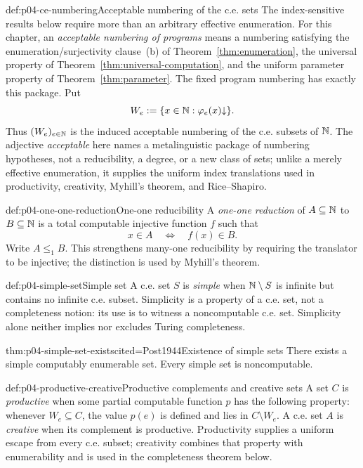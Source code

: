 \begin{hbconvention}{def:p04-ce-numbering}{Acceptable numbering of the c.e. sets}
The index-sensitive results below require more than an arbitrary effective
enumeration.  For this chapter, an \emph{acceptable numbering of programs}
means a numbering satisfying the enumeration/surjectivity clause~(b) of
Theorem~\ref{thm:enumeration}, the universal property of
Theorem~\ref{thm:universal-computation}, and the uniform parameter
property of Theorem~\ref{thm:parameter}.  The fixed program numbering has
exactly this package.  Put
\[
 W_e\mathrel{:=}\{x\in\mathbb{N}:\varphi_e(x)\mathord\downarrow\}.
\]
Thus \((W_e)_{e\in\mathbb{N}}\) is the induced acceptable numbering of the c.e.
subsets of \(\mathbb{N}\).  The adjective \emph{acceptable} here names a
metalinguistic package of numbering hypotheses, not a reducibility, a degree,
or a new class of sets; unlike a merely effective enumeration, it supplies
the uniform index translations used in productivity, creativity, Myhill's
theorem, and Rice--Shapiro.
\end{hbconvention}

\begin{hbdefinition}{def:p04-one-one-reduction}{One-one reducibility}
A \emph{one-one reduction} of \(A\subseteq\mathbb{N}\) to \(B\subseteq\mathbb{N}\) is a
total computable injective function \(f\) such that
\[
 x\in A\quad\Leftrightarrow\quad f(x)\in B.
\]
Write \(A\leq_1B\).  This strengthens many-one reducibility by requiring the
translator to be injective; the distinction is used by Myhill's theorem.
\end{hbdefinition}

\begin{hbdefinition}{def:p04-simple-set}{Simple set}
A c.e. set \(S\) is \emph{simple} when \(\mathbb{N}\setminus S\) is infinite but
contains no infinite c.e. subset.  Simplicity is a property of a c.e. set,
not a completeness notion: its use is to witness a noncomputable c.e. set.
Simplicity alone neither implies nor excludes Turing completeness.
\end{hbdefinition}

\begin{hbtheorem}{thm:p04-simple-set-exists}{cited=Post1944}{Existence of simple sets}
There exists a simple computably enumerable set.  Every simple set is
noncomputable.
\end{hbtheorem}

\begin{hbdefinition}{def:p04-productive-creative}{Productive complements and creative sets}
A set \(C\) is \emph{productive} when some partial computable function \(p\)
has the following property: whenever \(W_e\subseteq C\), the value \(p(e)\)
is defined and lies in \(C\setminus W_e\).  A c.e. set \(A\) is
\emph{creative} when its complement is productive.
Productivity supplies a uniform escape from every c.e. subset; creativity
combines that property with enumerability and is used in the completeness
theorem below.
\end{hbdefinition}

